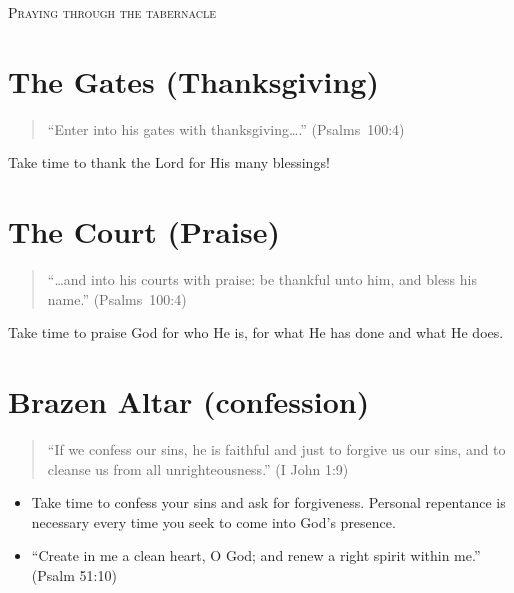 \begin{center}
\mbox{}

\bigskip

\LARGE\textsc{Praying through the tabernacle}

\end{center}

\pagestyle{empty}
\setlength{\parindent}{0em}

\section{The Gates (Thanksgiving)}


\begin{quote}
    ``Enter into his gates with thanksgiving\ldots{}.'' (Psalms~100:4)
\end{quote}

Take time to thank the Lord for His many blessings!


\section{The Court (Praise)}

\begin{quote}
``\dots{}and into his courts with praise: be thankful unto him, and bless his name.'' (Psalms~100:4)
\end{quote}

Take time to praise God for who He is, for what He has done and what He does.



\section{Brazen Altar (confession)}

\begin{quote}
``If we confess our sins, he is faithful and just to forgive us our sins,
    and to cleanse us from all unrighteousness.'' (I John 1:9)
\end{quote}

\begin{itemize}
\item Take time to confess your sins and ask for forgiveness.
    Personal repentance is necessary every time you seek to come into God’s presence.
\item ``Create in me a clean heart, O God; and renew a right spirit within me.'' (Psalm 51:10)
\end{itemize}


